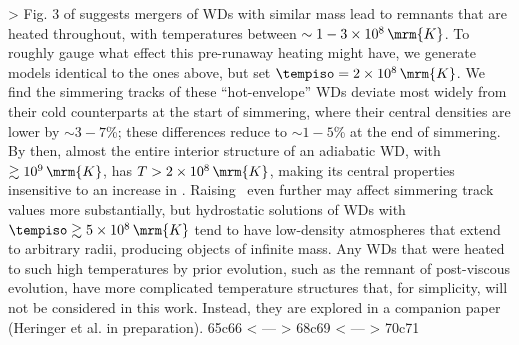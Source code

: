 > Fig. 3 of \citeal{zhu+13} suggests mergers of WDs with similar mass lead to remnants that are heated throughout, with temperatures between $\sim 1 - 3\times10^8\,\mrm{K}$.  To roughly gauge what effect this pre-runaway heating might have, we generate models identical to the ones above, but set $\tempiso = 2\times10^8\,\mrm{K}$.  We find the simmering tracks of these ``hot-envelope'' WDs deviate most widely from their cold counterparts at the start of simmering, where their central densities are lower by $\sim3-7$\%; these differences reduce to $\sim1 - 5$\% at the end of simmering.  By then, almost the entire interior structure of an adiabatic WD, with \Tc\ $\gtrsim10^9\,\mrm{K}$, has $T > 2\times10^8\,\mrm{K}$, making its central properties insensitive to an increase in \tempiso.  Raising \tempiso\ even further may affect simmering track values more substantially, but hydrostatic solutions of WDs with $\tempiso \gtrsim 5\times10^8\,\mrm{K}$ tend to have low-density atmospheres that extend to arbitrary radii, producing objects of infinite mass.  Any WDs that were heated to such high temperatures by prior evolution, such as the remnant of \cite{ji+13} post-viscous evolution, have more complicated temperature structures that, for simplicity, will not be considered in this work.  Instead, they are explored in a companion paper (Heringer et al. in preparation).
65c66
< %
---
> %
68c69
< \label{ssec:c5_runaway_superad}
---
> \label{ssec:runaway_superad}
70c71
